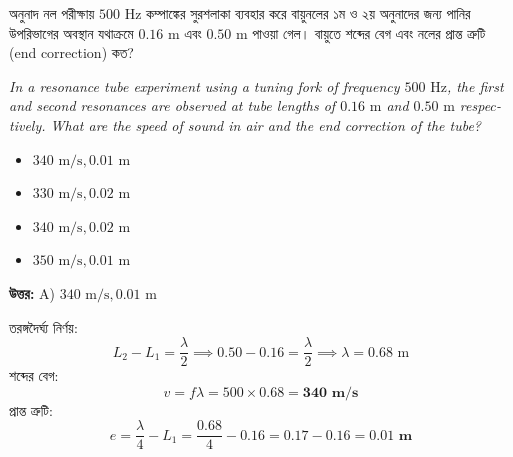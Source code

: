 \documentclass[12pt, a4paper]{article}
\begin{document}
\vspace{2em}

\begin{tcolorbox}[questionbox={প্রশ্ন (Question) 2}]
    \noindent
    অনুনাদ নল পরীক্ষায় $500\text{ Hz}$ কম্পাঙ্কের সুরশলাকা ব্যবহার করে বায়ুনলের ১ম ও ২য় অনুনাদের জন্য পানির উপরিভাগের অবস্থান যথাক্রমে $0.16\text{ m}$ এবং $0.50\text{ m}$ পাওয়া গেল। বায়ুতে শব্দের বেগ এবং নলের প্রান্ত ত্রুটি (end correction) কত?
    
    \vspace{0.8em}
    \begin{english}
    \noindent\textit{\color{darkgray}
    In a resonance tube experiment using a tuning fork of frequency $500\text{ Hz}$, the first and second resonances are observed at tube lengths of $0.16\text{ m}$ and $0.50\text{ m}$ respectively. What are the speed of sound in air and the end correction of the tube?
    }
    \end{english}
\end{tcolorbox}

\begin{itemize}[label={}, leftmargin=1cm, itemsep=0.5em]
    \item[\textbf{A)}] $340\text{ m/s}, 0.01\text{ m}$
    \item[\textbf{B)}] $330\text{ m/s}, 0.02\text{ m}$
    \item[\textbf{C)}] $340\text{ m/s}, 0.02\text{ m}$
    \item[\textbf{D)}] $350\text{ m/s}, 0.01\text{ m}$
\end{itemize}

\vspace{0.5em}
\begin{tcolorbox}[answerbox]
    \textbf{\color{success} উত্তর:} A) $340\text{ m/s}, 0.01\text{ m}$
\end{tcolorbox}
\vspace{1em}

\begin{tcolorbox}[solutionbox={সমাধান (Solution)}]
    \noindent
    তরঙ্গদৈর্ঘ্য নির্ণয়:
    \[ L_2 - L_1 = \frac{\lambda}{2} \implies 0.50 - 0.16 = \frac{\lambda}{2} \implies \lambda = 0.68\text{ m} \]
    শব্দের বেগ:
    \[ v = f \lambda = 500 \times 0.68 = \mathbf{340\text{ m/s}} \]
    প্রান্ত ত্রুটি:
    \[ e = \frac{\lambda}{4} - L_1 = \frac{0.68}{4} - 0.16 = 0.17 - 0.16 = \mathbf{0.01\text{ m}} \]
\end{tcolorbox}
\end{document}
